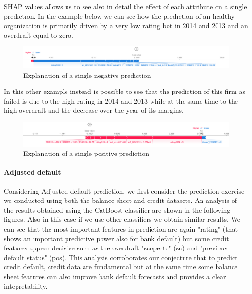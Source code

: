 SHAP values allows us to see also in detail the effect of each attribute on a single prediction.
In the example below we can see how the prediction of an healthy organization is primarily driven by a very low rating bot in 2014 and 2013 and an overdraft equal to zero.
\begin{figure}[H]
\includegraphics[scale=0.4]{latex/figs/bankrupt1_exp.png}
\caption{Explanation of a single negative prediction}
\end{figure}
In this other example instead is possible to see that the prediction of this firm as failed is due to the high rating in 2014 and 2013 while at the same time to the high overdraft and the decrease over the year of its margins.
\begin{figure}[H]

\includegraphics[scale=0.4]{latex/figs/bankrupt2_exp.png}
\caption{Explanation of a single positive prediction}
\end{figure}


\paragraph{Adjusted default}

Considering Adjusted default prediction, we first consider the prediction exercise we conducted using both the balance sheet and credit datasets. An analysis of the results obtained using the CatBoost classifier are shown in the following figures. Also in this case if we use other classifiers we obtain similar results. 
We can see that the most important features in prediction are again "rating" (that shows an important predictive power also for bank default) but some credit features appear decisive such as the overdraft "scoperto" (sc) and "previous default status" (pos).  
This analysis corroborates our conjecture that to predict credit default, credit data are fundamental but at the same time some balance sheet features can also improve bank default forecasts and provides a clear intepretability.


